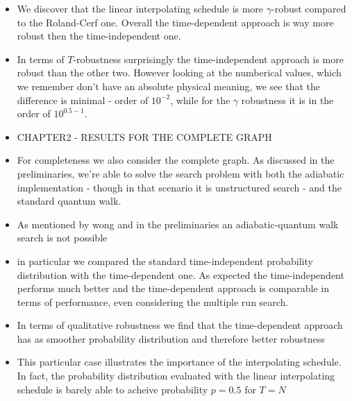 \begin{itemize}
  \item We discover that the linear interpolating schedule is more $\gamma$-robust compared to the Roland-Cerf one. Overall the time-dependent approach is way more robust then the time-independent one.
  \item In terms of $T$-robustness surprisingly the time-independent approach is more robust than the other two. However looking at the numberical values, which we remember don't have an absolute physical meaning, we see that the difference is minimal - order of $10^{-2}$, while for the $\gamma$ robustness it is in the order of $10^{0.5 - 1}$.


  \item CHAPTER2  - RESULTS FOR THE COMPLETE GRAPH
  \item For completeness we also consider the complete graph. As discussed in the preliminaries, we're able to solve the search problem with both the adiabatic implementation - though in that scenario it is unstructured search - and the standard quantum walk.
  \item As mentioned by wong and in the preliminaries an adiabatic-quantum walk search is not possible
  \item in particular we compared the standard time-independent probability distribution with the time-dependent one. As expected the time-independent performs much better and the time-dependent approach is comparable in terms of performance, even considering the multiple run search.
  \item In terms of qualitative robustness we find that the time-dependent approach has as smoother probability distribution and therefore better robustness
  \item This particular case illustrates the importance of the interpolating schedule. In fact, the probability distribution evaluated with the linear interpolating schedule is barely able to acheive probability $p=0.5$ for $T=N$


\end{itemize}

